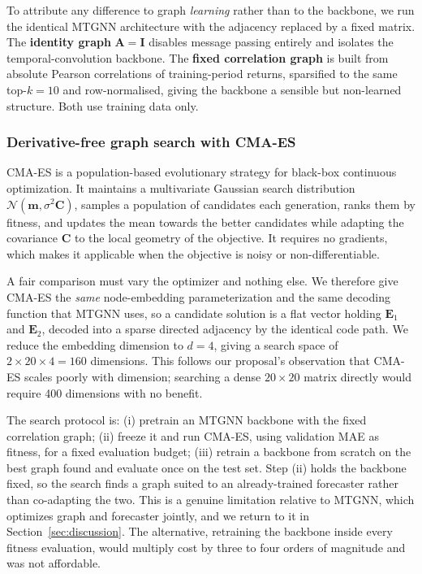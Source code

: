 To attribute any difference to graph \emph{learning} rather than to the backbone, we run the identical MTGNN architecture with the adjacency replaced by a fixed matrix. The \textbf{identity graph} $\mathbf{A} = \mathbf{I}$ disables message passing entirely and isolates the temporal-convolution backbone. The \textbf{fixed correlation graph} is built from absolute Pearson correlations of training-period returns, sparsified to the same top-$k=10$ and row-normalised, giving the backbone a sensible but non-learned structure. Both use training data only.

\subsubsection{Derivative-free graph search with CMA-ES}

CMA-ES \parencite{hansen2001cmaes,hansen2016cma} is a population-based evolutionary strategy for black-box continuous optimization. It maintains a multivariate Gaussian search distribution $\mathcal{N}(\mathbf{m}, \sigma^2\mathbf{C})$, samples a population of candidates each generation, ranks them by fitness, and updates the mean towards the better candidates while adapting the covariance $\mathbf{C}$ to the local geometry of the objective. It requires no gradients, which makes it applicable when the objective is noisy or non-differentiable.

A fair comparison must vary the optimizer and nothing else. We therefore give CMA-ES the \emph{same} node-embedding parameterization and the same decoding function that MTGNN uses, so a candidate solution is a flat vector holding $\mathbf{E}_1$ and $\mathbf{E}_2$, decoded into a sparse directed adjacency by the identical code path. We reduce the embedding dimension to $d = 4$, giving a search space of $2 \times 20 \times 4 = 160$ dimensions. This follows our proposal's observation that CMA-ES scales poorly with dimension; searching a dense $20\times 20$ matrix directly would require 400 dimensions with no benefit.

The search protocol is: (i) pretrain an MTGNN backbone with the fixed correlation graph; (ii) freeze it and run CMA-ES, using validation MAE as fitness, for a fixed evaluation budget; (iii) retrain a backbone from scratch on the best graph found and evaluate once on the test set. Step (ii) holds the backbone fixed, so the search finds a graph suited to an already-trained forecaster rather than co-adapting the two. This is a genuine limitation relative to MTGNN, which optimizes graph and forecaster jointly, and we return to it in Section~\ref{sec:discussion}. The alternative, retraining the backbone inside every fitness evaluation, would multiply cost by three to four orders of magnitude and was not affordable.

